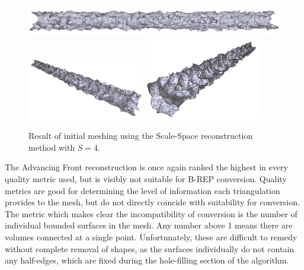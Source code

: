 \documentclass[12pt]{drexelthesis}
\begin{document}
\begin{figure}[!ht]
	
	\centering
		\includegraphics[width=5in]{simulated-lab-scan/2cmnoise/2cmmeshNeat/scalespace400.png}
		\includegraphics[width=2in]{simulated-lab-scan/2cmnoise/2cmmeshNeat/scalespace401.png}
		\includegraphics[width=2in]{simulated-lab-scan/2cmnoise/2cmmeshNeat/scalespace402.png}
		\caption[Initial meshing using a Scale-Space reconstruction with $S = 4$]{\centering  Result of initial meshing using the Scale-Space reconstruction method with $S = 4$.}
		\label{2cmnoise:scalespace4}
\end{figure}

The Advancing Front reconstruction is once again ranked the highest in every quality metric used, but is visibly not suitable for B-REP conversion. Quality metrics are good for determining the level of information each triangulation provides to the mesh, but do not directly coincide with suitability for conversion. The metric which makes clear the incompatibility of conversion is the number of individual bounded surfaces in the mesh. Any number above 1 means there are volumes connected at a single point. Unfortunately, these are difficult to remedy without complete removal of shapes, as the surfaces individually do not contain any half-edges, which are fixed during the hole-filling section of the algorithm.
\end{document}
